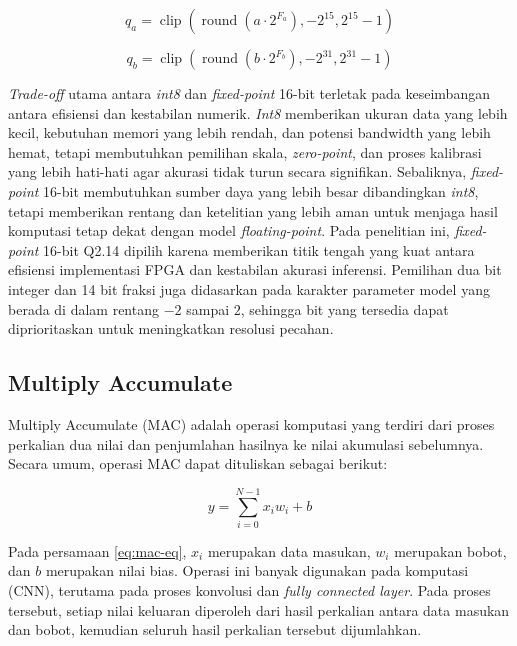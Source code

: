   \begin{equation}
      q_a =
      \operatorname{clip}
      \left(
      \operatorname{round}(a \cdot 2^{F_a}),
      -2^{15},
      2^{15}-1
      \right)
      \label{eq:fixed_activation_quantization}
  \end{equation}

  \begin{equation}
      q_b =
      \operatorname{clip}
      \left(
      \operatorname{round}(b \cdot 2^{F_b}),
      -2^{31},
      2^{31}-1
      \right)
      \label{eq:fixed_bias_quantization}
  \end{equation}

  \emph{Trade-off} utama antara \emph{int8} dan \emph{fixed-point} 16-bit terletak pada
  keseimbangan antara efisiensi dan kestabilan numerik. \emph{Int8} memberikan ukuran data
  yang lebih kecil, kebutuhan memori yang lebih rendah, dan potensi bandwidth yang
  lebih hemat, tetapi membutuhkan pemilihan skala, \emph{zero-point}, dan proses
  kalibrasi yang lebih hati-hati agar akurasi tidak turun secara signifikan.
  Sebaliknya, \emph{fixed-point} 16-bit membutuhkan sumber daya yang lebih besar
  dibandingkan \emph{int8}, tetapi memberikan rentang dan ketelitian yang lebih aman untuk
  menjaga hasil komputasi tetap dekat dengan model \emph{floating-point}. Pada
  penelitian ini, \emph{fixed-point} 16-bit Q2.14 dipilih karena memberikan titik
  tengah yang kuat antara efisiensi implementasi FPGA dan kestabilan akurasi
  inferensi. Pemilihan dua bit integer dan 14 bit fraksi juga didasarkan pada
  karakter parameter model yang berada di dalam rentang $-2$ sampai $2$, sehingga
  bit yang tersedia dapat diprioritaskan untuk meningkatkan resolusi pecahan.

  \subsection{Multiply Accumulate}
  Multiply Accumulate (MAC) adalah operasi komputasi yang terdiri dari proses perkalian
  dua nilai dan penjumlahan hasilnya ke nilai akumulasi sebelumnya. Secara umum, operasi
  MAC dapat dituliskan sebagai berikut:

  \begin{equation}
      y = \sum_{i=0}^{N-1} x_i w_i + b
      \label{eq:mac-eq}
  \end{equation}

  Pada persamaan \ref{eq:mac-eq}, $x_i$ merupakan data masukan, $w_i$ merupakan bobot,
  dan $b$ merupakan nilai bias. Operasi ini banyak digunakan pada komputasi
  (CNN), terutama pada proses konvolusi dan \emph{fully connected layer}.
  Pada proses tersebut, setiap nilai keluaran diperoleh dari hasil
  perkalian antara data masukan dan bobot, kemudian seluruh hasil perkalian
  tersebut dijumlahkan.

